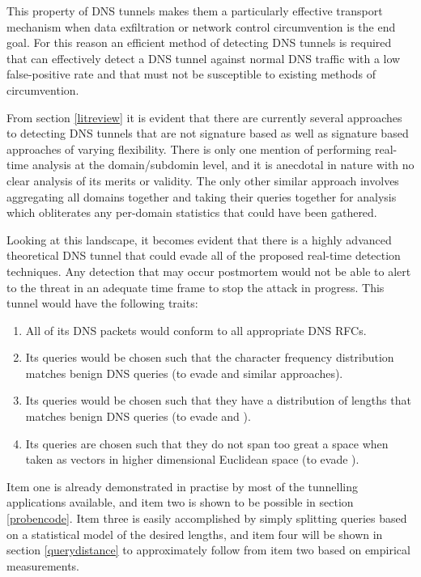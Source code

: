 \documentclass[12pt]{report}
\theoremstyle{remark}
\theoremstyle{definition}
\theoremstyle{definition}
\theoremstyle{definition}
\begin{document}
This property of DNS tunnels makes them a particularly effective transport
mechanism
when data exfiltration or network control circumvention is the end goal. For
this reason an efficient method of detecting DNS tunnels is required that can
effectively detect a DNS tunnel against normal DNS traffic with a low
false-positive rate and that must not be susceptible to existing methods of
circumvention.

From section \ref{litreview} it is evident that there are currently several
approaches to detecting DNS tunnels that are not signature based as well as
signature based approaches of varying flexibility. There is only one mention of
performing real-time analysis at the domain/subdomin level, and it is anecdotal in nature
with no clear analysis of its merits or validity. The only other similar
approach involves aggregating all domains together and taking their queries
together for analysis which obliterates any per-domain statistics that could have been gathered.

Looking at this landscape, it becomes evident that there is a highly advanced theoretical
DNS tunnel that could evade all of the proposed real-time detection techniques.
Any detection that may occur postmortem would not be
able to alert to the threat in an adequate time frame to stop the attack in
progress. This tunnel would have the following traits:

\begin{enumerate}
\item All of its DNS packets would conform to all appropriate DNS RFCs.
\item Its queries would be chosen such that the character frequency distribution
matches benign DNS queries (to evade \cite{Born2010.cfa} and similar approaches).
\item Its queries would be chosen such that they have a distribution of lengths that
matches benign DNS queries (to evade \cite{Karasaridis2006} and \cite{SANS2013}).
\item Its queries are chosen such that they do not span too great a space when taken as vectors in higher dimensional Euclidean space (to evade \cite{jhind2009}).
\end{enumerate}

Item one is already demonstrated in practise by most of the tunnelling
applications available, and item two is shown to be possible in section
\ref{probencode}. Item three is easily accomplished by simply splitting queries based on a statistical model of the desired lengths, and item four will be shown in section \ref{querydistance} to approximately follow from item two based on empirical measurements.
\end{document}
